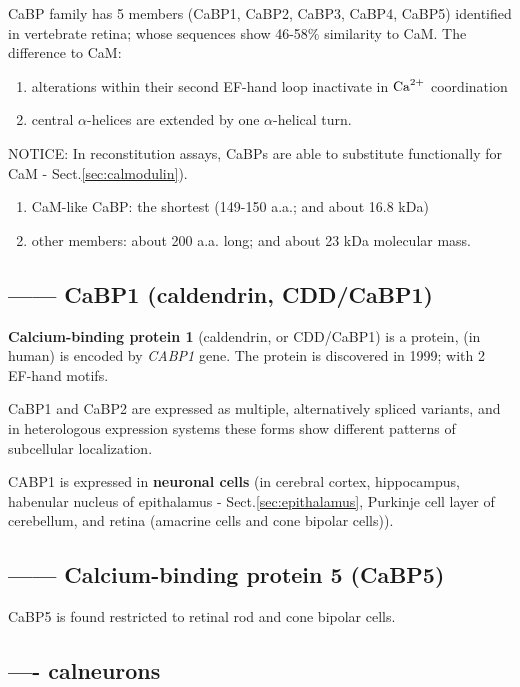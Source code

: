 CaBP family has 5 members (CaBP1, CaBP2, CaBP3, CaBP4, CaBP5) identified in
vertebrate retina; whose sequences show 46-58\% similarity to CaM. The
difference to CaM:
\begin{enumerate}
  \item  alterations within their second EF-hand loop inactivate in ${\text{Ca}^{2+}}$
  coordination
  
  \item central $\alpha$-helices are extended by one $\alpha$-helical turn. 
\end{enumerate}

NOTICE: In reconstitution assays, CaBPs are able to substitute functionally for
CaM - Sect.\ref{sec:calmodulin}).
\begin{enumerate}
  \item CaM-like CaBP: the shortest (149-150 a.a.; and about 16.8 kDa)
  
  \item other members: about 200 a.a. long; and about 23 kDa molecular mass. 
\end{enumerate}

\subsection{------ CaBP1 (caldendrin, CDD/CaBP1)}
\label{sec:caldendrin}
\label{sec:CDD-CaBP1}


{\bf Calcium-binding protein 1} (caldendrin, or CDD/CaBP1) is a protein, (in
human) is encoded by {\it CABP1} gene. The protein is discovered in 1999; with 2
EF-hand motifs.

CaBP1 and CaBP2 are expressed as multiple, alternatively spliced variants, and
in heterologous expression systems these forms show different patterns of
subcellular localization. 

CABP1 is expressed in {\bf neuronal cells} (in cerebral cortex, hippocampus,
habenular nucleus of epithalamus - Sect.\ref{sec:epithalamus}, Purkinje cell
layer of cerebellum, and retina (amacrine cells and cone bipolar cells)).


\subsection{------ Calcium-binding protein 5 (CaBP5)}
\label{sec:CaBP5}

CaBP5 is found  restricted to retinal rod and cone bipolar cells.

\subsection{---- calneurons}
\label{sec:calneurons}



